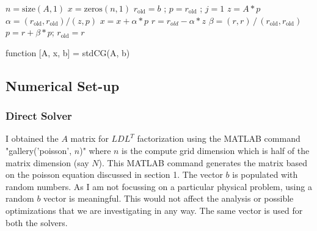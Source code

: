 \documentclass{article}
\begin{document}
\begin{spacing}{1.1}
\begin{algorithm}[H]

\begin{algorithmic}[1]

\STATE $n = \text{size}(A,1)$ 
\STATE $x = \text{zeros}(n,1)$
\STATE $r_{\text{old}} = b$ ; $p = r_{\text{old}}$ ; $j = 1$
\STATE $z = A*p$ 
\STATE ${\alpha} = (r_{\text{old}}, r_{\text{old}})/(z, p)$
\STATE $x = x + \alpha * p$ 
\STATE $r = r_{old} - \alpha * z$
\STATE $\beta = (r, r) \, / \, (r_{\text{old}}, r_{\text{old}})$
\STATE $p = r + \beta* p$;
\STATE $r_{\text{old}} = r$
\ENDFOR
\end{algorithmic}
\caption{\label{algoCG} function [A, x, b] = stdCG(A, b)} 
\end{algorithm}

\subsection{Numerical Set-up}

\subsubsection{Direct Solver}
	I obtained the $A$ matrix for $LDL^T$ factorization using the MATLAB command "gallery('poisson', $n$)" where $n$ is the compute grid dimension which is half of the matrix dimension (say $N$). This MATLAB command generates the matrix based on the poisson equation discussed in section 1. The vector $b$ is populated with random numbers. As I am not focussing on a particular physical problem, using a random $b$ vector is meaningful. This would not affect the analysis or possible optimizations that we are investigating in any way. The same vector is used for both the solvers.


\end{spacing}
\end{document}

